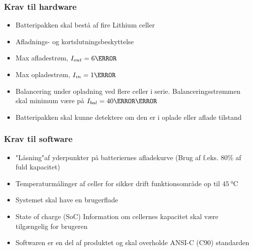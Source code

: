 \subsubsection{Krav til hardware}
\begin{itemize}[noitemsep]
	\item Batteripakken skal bestå af fire Lithium celler
	\item Afladnings- og kortslutningsbeskyttelse
	\item Max afladestrøm, $I_{out} = 6\ampere$
	\item Max opladestrøm, $I_{in} = 1\ampere$
	\item Balancering under opladning ved flere celler i serie. Balanceringsstrømmen skal minimum være på $I_{bal} = 40\milli\ampere$
	\item Batteripakken skal kunne detektere om den er i oplade eller aflade tilstand
\end{itemize}

\subsubsection{Krav til software}
\begin{itemize}[noitemsep]
	\item "Låsning"\space af yderpunkter på batteriernes afladekurve (Brug af f.eks. 80\% af fuld kapacitet)
	\item Temperaturmålinger af celler for sikker drift \textemdash \space funktionsområde op til $\SI{45}{\celsius}$
	\item Systemet skal have en brugerflade
	\item State of charge (SoC) \textemdash \space Information om cellernes kapacitet skal være tilgængelig for brugeren
	\item Softwaren er en del af produktet og skal overholde ANSI-C (C90) standarden
\end{itemize}



